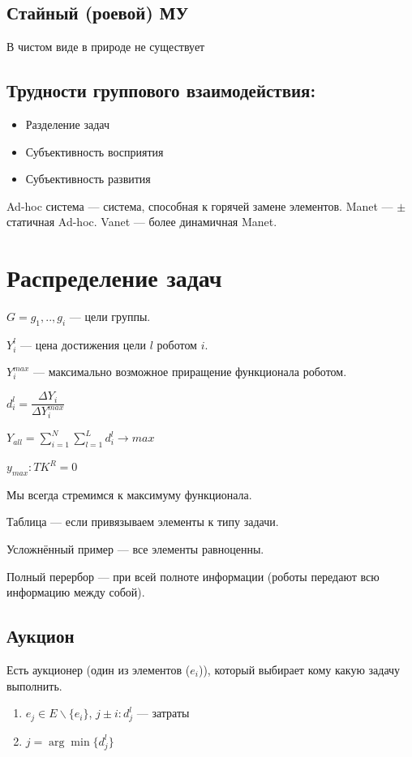 \documentclass[12pt]{article}
\begin{document}
\subsection{Стайный (роевой) МУ}
В чистом виде в природе не существует

\subsection*{Трудности группового взаимодействия:}
\begin{itemize}
    \item Разделение задач
    \item Субъективность восприятия
    \item Субъективность развития
\end{itemize}

Ad-hoc система — система, способная к горячей замене элементов.
Manet — $\pm$ статичная Ad-hoc.
Vanet — более динамичная Manet.

\section{Распределение задач}
$G = {g_1, .., g_i}$ — цели группы.

$Y_i^l$ — цена достижения цели $l$ роботом $i$.

$Y_i^{max}$ — максимально возможное приращение функционала роботом.

$d_i^l = \dfrac{\Delta Y_i}{\Delta Y_i^{max}}$

$Y_{all} = \sum_{i = 1}^{N} \sum_{l = 1}^{L}d_i^l \rightarrow max$

$y_{max} : TK^R = 0$

Мы всегда стремимся к максимуму функционала.

Таблица — если привязываем элементы к типу задачи.

Усложнённый пример — все элементы равноценны.

Полный перербор — при всей полноте информации (роботы передают всю информацию между собой).

\subsection{Аукцион}
Есть аукционер (один из элементов ($e_i$)), который выбирает кому какую задачу выполнить.

\begin{enumerate}
    \item $e_j \in E \backslash \{e_i\}$, $j \pm i : d_j^l$ — затраты
    \item $j = \arg \min \{d_j^l\}$
\end{enumerate}
\end{document}
